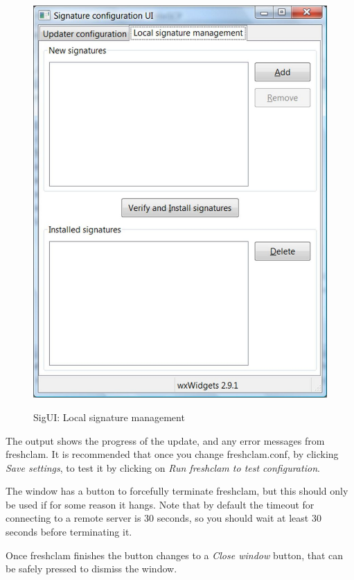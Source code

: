 \begin{figure}[htb]
\caption{SigUI: Local signature management}
\centering
\includegraphics{sigui_tab2.jpg}
\label{fig:tab1}
\end{figure}


The output shows the progress of the update, and any error messages from \gls{freshclam}.
It is recommended that once you change \gls{freshclam.conf}, by clicking \emph{Save settings}, to test it by clicking on \emph{Run freshclam to test configuration}.

The window has a button to forcefully terminate \gls{freshclam}, but this should only be used if for some reason it hangs. Note that by default the timeout for connecting to a remote server is 30 seconds, so you should wait at least 30 seconds before terminating it.

Once \gls{freshclam} finishes the button changes to a \emph{Close window} button, that can be safely pressed to dismiss the window.


